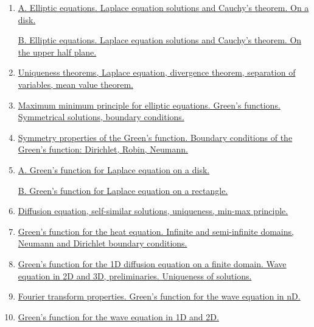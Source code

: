 \documentclass[11pt]{article}
\begin{document}
\begin{enumerate}
	\item \href{https://mp.weixin.qq.com/s/Dw2o2LMci8CwqPOl2KMVNw}{A. Elliptic equations. Laplace equation solutions and Cauchy's theorem. On a disk.}
	
	\href{https://mp.weixin.qq.com/s/kNSWJN3NIRHIulHjia_kIQ}{B. Elliptic equations. Laplace equation solutions and Cauchy's theorem. On the upper half plane.}
	
	\item \href{https://mp.weixin.qq.com/s/A0gLPUPrjcfldLZEkHkg-w}{Uniqueness theorems, Laplace equation, divergence theorem, separation of variables, mean value theorem.}
	
	\item \href{https://mp.weixin.qq.com/s/aeXUeqWmoY5JoOPmUcWwFw}{Maximum minimum principle for elliptic equations. Green's functions. Symmetrical solutions, boundary conditions.}
	
	\item \href{https://mp.weixin.qq.com/s/gHA_9Vs08DL6NN1FKyrjaQ}{Symmetry properties of the Green's function. Boundary conditions of the Green's function: Dirichlet, Robin, Neumann.}
	
	\item \href{https://mp.weixin.qq.com/s/xfpUo9SA87Hx3VDCTCohFg}{A. Green's function for Laplace equation on a disk.}
	
	\href{https://mp.weixin.qq.com/s/GE_Pj88pS-HpVW5vy2ik8w}{B. Green's function for Laplace equation on a rectangle.}
	
	\item \href{https://mp.weixin.qq.com/s/ew3RB7O88ee-e_bKfSysYw}{Diffusion equation, self-similar solutions, uniqueness, min-max principle.}
	
	\item \href{https://mp.weixin.qq.com/s/XPegaa_n68JjQHbRwDvKgw}{Green's function for the heat equation. Infinite and semi-infinite domains, Neumann and Dirichlet boundary conditions.}
	
	\item \href{https://mp.weixin.qq.com/s/KkM-N670DaRBvqIGBB7e6Q}{Green's function for the 1D diffusion equation on a finite domain. Wave equation in 2D and 3D, preliminaries. Uniqueness of solutions.}
	
	\item \href{https://mp.weixin.qq.com/s/D-nhhvh1Mz7UY5PRVPBi3w}{Fourier transform properties. Green's function for the wave equation in nD.}
	
	\item \href{https://mp.weixin.qq.com/s/DtagtlN-D4l30hzckLhYKA}{Green's function for the wave equation in 1D and 2D.}
	

\end{enumerate}
\end{document}
